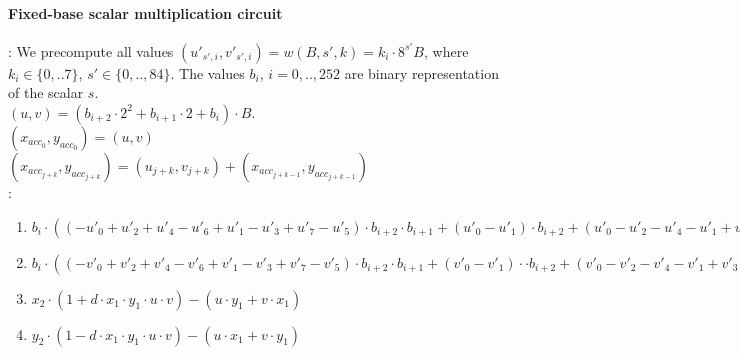 \paragraph{Fixed-base scalar multiplication circuit}:
We precompute all values $(u'_{s', i}, v'_{s', i}) = w(B,s',k) = k_i \cdot 8^{s'} B$, where $k_i \in \{ 0,..7 \}$, $s' \in \{0,.., 84\}$.
The values $b_i$, $i = 0,.., 252$ are binary representation of the scalar $s$.\\
$(u, v) = (b_{i + 2} \cdot 2^2 + b_{i + 1}\cdot 2 + b_i) \cdot B$.\\
 $(x_{acc_{0}}, y_{acc_{0}}) = (u, v) $ \\
 $(x_{acc_{j + k}}, y_{acc_{j + k}}) = (u_{j + k}, v_{j + k}) + (x_{acc_{j + k - 1}}, y_{acc_{j + k - 1}}) $ \\:
\begin{enumerate}
    \item 
        $b_i \cdot ((-u'_0 + u'_2 + u'_4 - u'_6 + u'_1 - u'_3 + u'_7 - u'_5) \cdot b_{i + 2} \cdot b_{i + 1} + (u'_0 - u'_1) \cdot b_{i + 2} + (u'_0 - u'_2 - u'_4 - u'_1 + u'_3 + u'_5) \cdot b_{i + 1} - u'_0 + u'_1 ) -
        (u - (u'_0 + u'_2 + u'_4 -u'_6) \cdot b_{i + 1} \cdot b_{i + 2} + u'_0 \cdot b_{i + 2} + (u'_0 - u'_2 - u'_4) \cdot b_{i + 1}
        - u'_0)$
    \item 
	$b_i \cdot ((-v'_0 + v'_2 + v'_4 - v'_6 + v'_1 - v'_3 + v'_7 - v'_5) \cdot b_{i + 2} \cdot b_{i + 1} + (v'_0 - v'_1) \cdot \cdot b_{i + 2} + (v'_0 - v'_2 - v'_4 - v'_1 + v'_3 + v'_5) \cdot \cdot b_{i + 1} - v'_0 + v'_1 ) -
        (v - (v'_0 + v'_2 + v'_4 - v'_6) \cdot b_{i + 1} \cdot b_{i + 2} + v'_0 \cdot b_{i + 2} + (v'_0 - v'_2 - v'_4) \cdot b_{i + 1}
        - v'_0)$
    \item 
        $x_2 \cdot (1 + d \cdot x_1 \cdot y_1 \cdot u \cdot v) - (u \cdot y_1 + v \cdot x_1)$
    \item 
        $y_2 \cdot (1 - d \cdot x_1 \cdot y_1 \cdot u \cdot v) - (u \cdot x_1 + v \cdot y_1)$
\end{enumerate}

